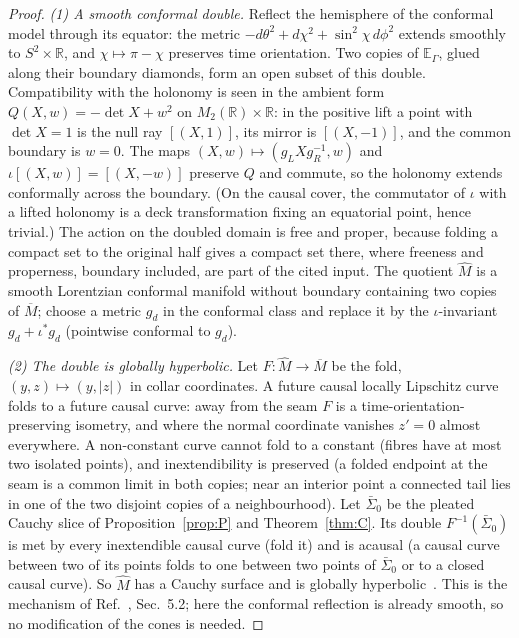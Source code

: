 \documentclass[aps,prd,onecolumn,superscriptaddress,nofootinbib,amsmath,amssymb,11pt]{revtex4-2}
\theoremstyle{definition}
\newcommand{\R}{\mathbb{R}}
\newcommand{\Mbar}{\overline{M}}
\newcommand{\EG}{\mathbb{E}_\Gamma}
\begin{document}
\begin{proof}
\emph{(1) A smooth conformal double.} Reflect the hemisphere of the conformal model through its equator: the metric
$-d\theta^2+d\chi^2+\sin^2\chi\,d\phi^2$ extends smoothly to $S^2\times\R$, and $\chi\mapsto\pi-\chi$ preserves time orientation.
Two copies of $\EG$, glued along their boundary diamonds, form an open subset of this double. Compatibility with the holonomy is
seen in the ambient form $Q(X,w)=-\det X+w^2$ on $M_2(\R)\times\R$: in the positive lift a point with $\det X=1$ is the null ray
$[(X,1)]$, its mirror is $[(X,-1)]$, and the common boundary is $w=0$. The maps $(X,w)\mapsto(g_LXg_R^{-1},w)$ and
$\iota[(X,w)]=[(X,-w)]$ preserve $Q$ and commute, so the holonomy extends conformally across the boundary. (On the causal cover,
the commutator of $\iota$ with a lifted holonomy is a deck transformation fixing an equatorial point, hence trivial.) The action on
the doubled domain is free and proper, because folding a compact set to the original half gives a compact set there, where
freeness and properness, boundary included, are part of the cited input. The quotient $\widehat M$ is a smooth Lorentzian conformal
manifold without boundary containing two copies of $\Mbar$; choose a metric $g_d$ in the conformal class and replace it by the
$\iota$-invariant $g_d+\iota^*g_d$ (pointwise conformal to $g_d$).

\emph{(2) The double is globally hyperbolic.} Let $F:\widehat M\to\Mbar$ be the fold, $(y,z)\mapsto(y,|z|)$ in collar coordinates. A
future causal locally Lipschitz curve folds to a future causal curve: away from the seam $F$ is a time-orientation-preserving
isometry, and where the normal coordinate vanishes $z'=0$ almost everywhere. A non-constant curve cannot fold to a constant
(fibres have at most two isolated points), and inextendibility is preserved (a folded endpoint at the seam is a common limit in
both copies; near an interior point a connected tail lies in one of the two disjoint copies of a neighbourhood). Let
$\bar\Sigma_0$ be the pleated Cauchy slice of Proposition~\ref{prop:P} and Theorem~\ref{thm:C}. Its double $F^{-1}(\bar\Sigma_0)$ is met
by every inextendible causal curve (fold it) and is acausal (a causal curve between two of its points folds to one between two
points of $\bar\Sigma_0$ or to a closed causal curve). So $\widehat M$ has a Cauchy surface and is globally
hyperbolic~\cite{Geroch1970}. This is the mechanism of Ref.~\cite{AkeFloresSanchez2021}, Sec.~5.2; here the conformal reflection is
already smooth, so no modification of the cones is needed.


\end{proof}
\end{document}
